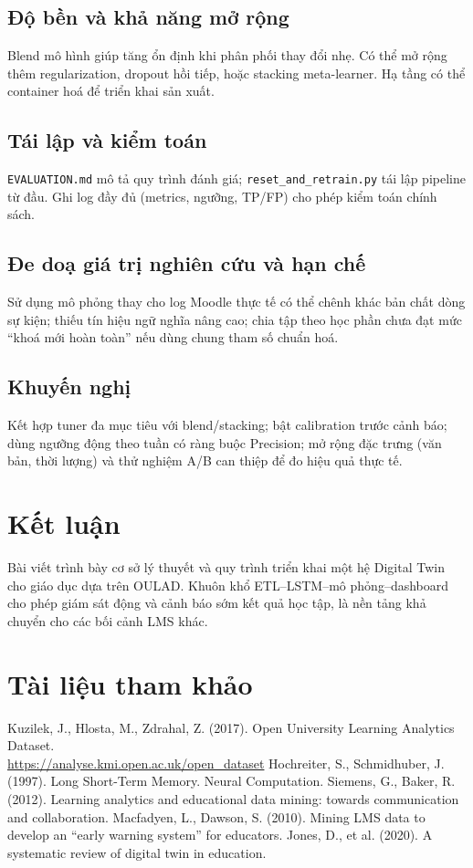 \documentclass[12pt,a4paper]{article}
\newcommand{\dataset}{OULAD}
\begin{document}
\subsection{Độ bền và khả năng mở rộng}
Blend mô hình giúp tăng ổn định khi phân phối thay đổi nhẹ. Có thể mở rộng thêm regularization, dropout hồi tiếp, hoặc stacking meta-learner. Hạ tầng có thể container hoá để triển khai sản xuất.

\subsection{Tái lập và kiểm toán}
\texttt{EVALUATION.md} mô tả quy trình đánh giá; \texttt{reset\_and\_retrain.py} tái lập pipeline từ đầu. Ghi log đầy đủ (metrics, ngưỡng, TP/FP) cho phép kiểm toán chính sách.

\subsection{Đe doạ giá trị nghiên cứu và hạn chế}
Sử dụng mô phỏng thay cho log Moodle thực tế có thể chênh khác bản chất dòng sự kiện; thiếu tín hiệu ngữ nghĩa nâng cao; chia tập theo học phần chưa đạt mức “khoá mới hoàn toàn” nếu dùng chung tham số chuẩn hoá.

\subsection{Khuyến nghị}
Kết hợp tuner đa mục tiêu với blend/stacking; bật calibration trước cảnh báo; dùng ngưỡng động theo tuần có ràng buộc Precision; mở rộng đặc trưng (văn bản, thời lượng) và thử nghiệm A/B can thiệp để đo hiệu quả thực tế.

\section*{Kết luận}
Bài viết trình bày cơ sở lý thuyết và quy trình triển khai một hệ Digital Twin cho giáo dục dựa trên \dataset{}. Khuôn khổ ETL--LSTM--mô phỏng--dashboard cho phép giám sát động và cảnh báo sớm kết quả học tập, là nền tảng khả chuyển cho các bối cảnh LMS khác.

\section*{Tài liệu tham khảo}
\begin{thebibliography}{9}
 Kuzilek, J., Hlosta, M., Zdrahal, Z. (2017). Open University Learning Analytics Dataset.\\ \url{https://analyse.kmi.open.ac.uk/open_dataset}
 Hochreiter, S., Schmidhuber, J. (1997). Long Short-Term Memory. Neural Computation.
 Siemens, G., Baker, R. (2012). Learning analytics and educational data mining: towards communication and collaboration.
 Macfadyen, L., Dawson, S. (2010). Mining LMS data to develop an ``early warning system'' for educators.
 Jones, D., et al. (2020). A systematic review of digital twin in education.
\end{thebibliography}
\end{document}

